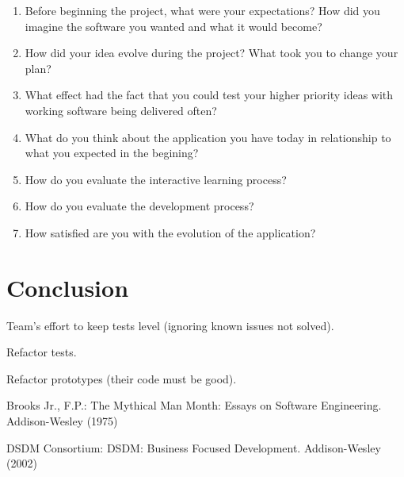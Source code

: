 \documentclass[lnbip]{svmultln}
\begin{document}
\begin{enumerate}
\item Before beginning the project, what were your expectations? How did you imagine the software you wanted and what it would become?
\item How did your idea evolve during the project? What took you to change your plan?
\item What effect had the fact that you could test your higher priority ideas with working software being delivered often?
\item What do you think about the application you have today in relationship to what you expected in the begining?
\item How do you evaluate the interactive learning process?
\item How do you evaluate the development process?
\item How satisfied are you with the evolution of the application?
\end{enumerate}

\section{Conclusion}
\label{sec:conclusion}

Team's effort to keep tests level (ignoring known issues not solved).

Refactor tests.

Refactor prototypes (their code must be good).

%
%
\begin{thebibliography}{5}

 Brooks Jr., F.P.: The Mythical Man Month: Essays
  on Software Engineering. Addison-Wesley (1975)

 DSDM Consortium: DSDM: Business Focused Development. Addison-Wesley (2002)




\end{thebibliography}
%
\end{document}
